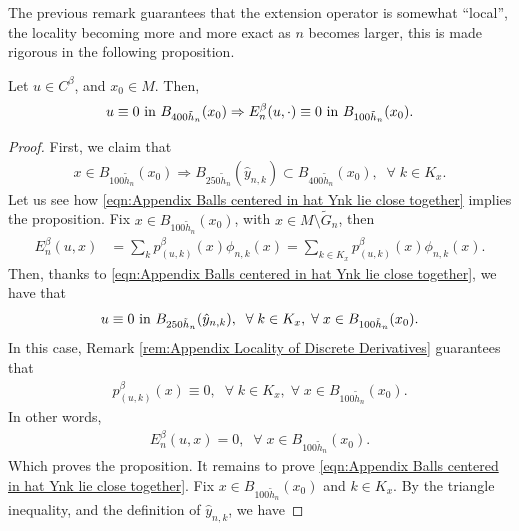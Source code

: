\documentclass[11pt,reqno]{amsart}
\numberwithin{equation}{section}
\theoremstyle{plain}
\begin{document}
The previous remark guarantees that the extension operator is somewhat ``local'', the locality becoming more and more exact as $n$ becomes larger, this is made rigorous in the following proposition. 
\begin{prop}\label{prop:Appendix Estimate on Locality of the Extension}
  Let $u \in C^\beta$, and $x_0 \in M$. Then,
  \begin{align*}
    u \equiv 0 \textnormal{ in } B_{400\tilde h_n}(x_0) \Rightarrow E_n^\beta (u,\cdot) \equiv 0 \textnormal{ in } B_{100\tilde h_n}(x_0). 
  \end{align*}
  
\end{prop}

\begin{proof}  
  First, we claim that
  \begin{align}
    x \in B_{100\tilde h_n}(x_0) \Rightarrow B_{250 \tilde h_n}(\hat y_{n,k}) \subset B_{400 \tilde h_n}(x_0),\;\;\forall\; k\in K_x. \label{eqn:Appendix Balls centered in hat Ynk lie close together}
  \end{align}
  Let us see how \eqref{eqn:Appendix Balls centered in hat Ynk lie close together} implies the proposition. Fix $x \in B_{100 \tilde h_n}(x_0)$, with $x\in M\setminus \tilde G_n$, then
  \begin{align*}
    E_n^\beta (u,x) & = \sum\limits_{k} p_{(u,k)}^\beta(x)\phi_{n,k}(x) = \sum\limits_{k\in K_x} p_{(u,k)}^\beta(x)\phi_{n,k}(x).
  \end{align*}
  Then, thanks to \eqref{eqn:Appendix Balls centered in hat Ynk lie close together}, we have that 
  \begin{align*}
    u \equiv 0 \textnormal{ in } B_{250 \tilde h_n}(\hat y_{n,k}),\;\;\forall\;k\in K_x,\;\forall\; x\in B_{100\tilde h_n}(x_0).
  \end{align*}
  In this case, Remark \ref{rem:Appendix Locality of Discrete Derivatives} guarantees that
  \begin{align*}
    p_{(u,k)}^\beta(x)\equiv 0,\;\;\forall\;k\in K_x,\;\forall\;x\in B_{100\tilde h_n}(x_0).
  \end{align*}
  In other words, 
  \begin{align*}
    E_n^\beta (u,x) =0,\;\;\forall\;x\in B_{100\tilde h_n}(x_0).
  \end{align*}	
  Which proves the proposition. It remains to prove \eqref{eqn:Appendix Balls centered in hat Ynk lie close together}. Fix $x \in B_{100 \tilde h_n}(x_0)$ and $k\in K_x$.   By the triangle inequality, and the definition of $\hat y_{n,k}$, we have

\end{proof}
\end{document}
